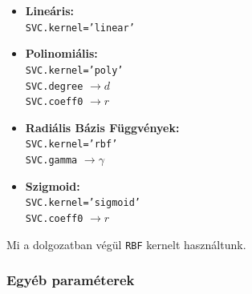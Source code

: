 \begin{itemize}
\item
	\textbf{Lineáris:} \\
	\texttt{SVC.kernel='linear'}
\item
	\textbf{Polinomiális:} \\
	\texttt{SVC.kernel='poly'}	\\
	\texttt{SVC.degree} $ \rightarrow d $ \\
	\texttt{SVC.coeff0} $ \rightarrow r $
\item 
	\textbf{Radiális Bázis Függvények:} \\
	\texttt{SVC.kernel='rbf'}	\\
	\texttt{SVC.gamma} $ \rightarrow \gamma $
\item 
	\textbf{Szigmoid:} \\
	\texttt{SVC.kernel='sigmoid'}	\\
	\texttt{SVC.coeff0} $ \rightarrow r $
\end{itemize}
%
%
%
%
%
%
%
%
%
%
%
%
%
%
%
%
%


\noindent
Mi a dolgozatban végül \texttt{RBF} kernelt használtunk.

\subsubsection{Egyéb paraméterek}

